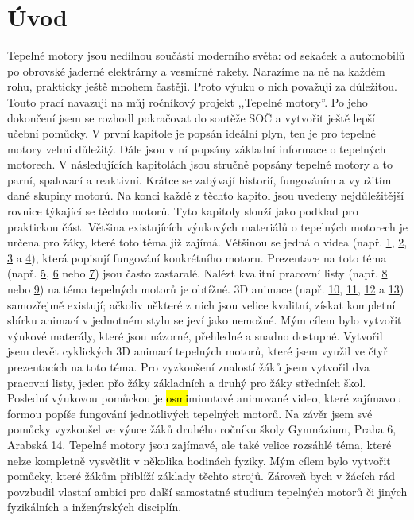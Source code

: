 \section{Úvod}
{Tepelné motory jsou nedílnou součástí moderního světa: od sekaček a automobilů po obrovské jaderné elektrárny a vesmírné rakety. Narazíme na ně na každém rohu, prakticky ještě mnohem častěji. Proto výuku o nich považuji za důležitou. Touto prací navazuji na můj ročníkový projekt ,,Tepelné motory”. Po jeho dokončení jsem se rozhodl pokračovat do soutěže SOČ a vytvořit ještě lepší učební pomůcky.}\odst
{V první kapitole je popsán ideální plyn, ten je pro tepelné motory velmi důležitý. Dále jsou v ní popsány základní informace o tepelných motorech. V následujících kapitolách jsou stručně popsány tepelné motory a to parní, spalovací a reaktivní. Krátce se zabývají historií, fungováním a využitím dané skupiny motorů. Na konci každé z těchto kapitol jsou uvedeny nejdůležitější rovnice týkající se těchto motorů. Tyto kapitoly slouží jako podklad pro praktickou část.}\odst
{Většina existujících výukových materiálů o tepelných motorech je určena pro žáky, které toto téma již zajímá. Většinou se jedná o videa (např. \href{https://www.youtube.com/watch?v=k9DhdvbmRiw}{1}, \href{https://www.youtube.com/watch?v=dR1pyp3q9Ko}{2}, \href{https://www.youtube.com/watch?v=eP8nWqcWmAc}{3} a \href{https://www.youtube.com/watch?v=Fpbg1jUh36M}{4}), která popisují fungování konkrétního motoru. Prezentace na toto téma (např. \href{https://zs-nucice.cz/UserFiles/File/eu_new_361-400/VY_32_INOVACE_374.pdf}{5}, \href{https://view.officeapps.live.com/op/view.aspx?src=http://dumy.cz/nahled/73077}{6} nebo \href{https://slideplayer.cz/slide/12677857/}{7}) jsou často zastaralé. Nalézt kvalitní pracovní listy (např. \href{https://view.officeapps.live.com/op/view.aspx?src=http://dumy.cz/nahled/117673}{8} nebo \href{https://www.soshlinky.cz/documents/uploads/71\%20Motory.xlsx}{9}) na téma tepelných motorů je obtížné. 3D animace (např. \href{https://www.youtube.com/watch?v=kWRRHRWuduk}{10}, \href{https://www.youtube.com/watch?v=ZQvfHyfgBtA&t=26s}{11}, \href{https://www.youtube.com/watch?v=MUxP3PCDRTE}{12} a \href{https://www.youtube.com/watch?v=Iiu3UyxLEHk}{13}) samozřejmě existují; ačkoliv některé z nich jsou velice kvalitní, získat kompletní sbírku animací v jednotném stylu se jeví jako nemožné.}\odst
{Mým cílem bylo vytvořit výukové materály, které jsou názorné, přehledné a snadno dostupné. Vytvořil jsem devět cyklických 3D animací tepelných motorů, které jsem využil ve čtyř prezentacích na toto téma. Pro vyzkoušení znalostí žáků jsem vytvořil dva pracovní listy, jeden přo žáky základních a druhý pro žáky středních škol. Poslední výukovou pomůckou je \hl{osmi}minutové animované video, které zajímavou formou popíše fungování jednotlivých tepelných motorů. Na závěr jsem své pomůcky vyzkoušel ve výuce žáků druhého ročníku školy Gymnázium, Praha 6, Arabská 14.}\odst
{Tepelné motory jsou zajímavé, ale také velice rozsáhlé téma, které nelze kompletně vysvětlit v několika hodinách fyziky. Mým cílem bylo vytvořit pomůcky, které žákům přiblíží základy těchto strojů. Zároveň bych v žácích rád povzbudil vlastní ambici pro další samostatné studium tepelných motorů či jiných fyzikálních a inženýrských disciplín.}